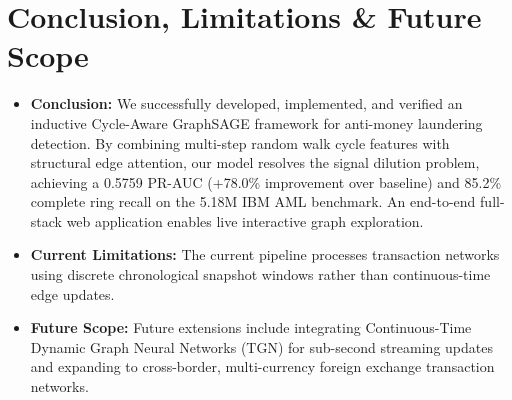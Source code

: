 \documentclass[11pt, a4paper]{article}
\begin{document}
\section{Conclusion, Limitations \& Future Scope}
\begin{itemize}[noitemsep, topsep=2pt]
    \item \textbf{Conclusion:} We successfully developed, implemented, and verified an inductive Cycle-Aware GraphSAGE framework for anti-money laundering detection. By combining multi-step random walk cycle features with structural edge attention, our model resolves the signal dilution problem, achieving a 0.5759 PR-AUC (+78.0\% improvement over baseline) and 85.2\% complete ring recall on the 5.18M IBM AML benchmark. An end-to-end full-stack web application enables live interactive graph exploration.
    \item \textbf{Current Limitations:} The current pipeline processes transaction networks using discrete chronological snapshot windows rather than continuous-time edge updates.
    \item \textbf{Future Scope:} Future extensions include integrating Continuous-Time Dynamic Graph Neural Networks (TGN) for sub-second streaming updates and expanding to cross-border, multi-currency foreign exchange transaction networks.
\end{itemize}

\end{document}
